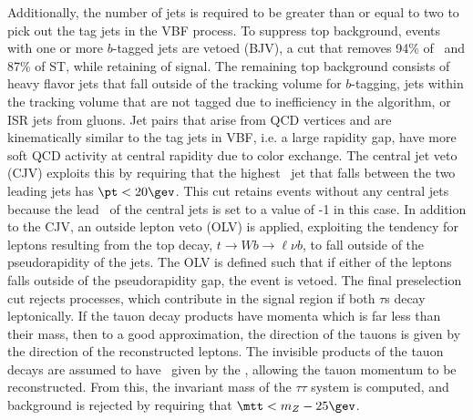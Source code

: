 Additionally, the number of jets is required to be greater than or
equal to two to pick out the tag jets in the VBF process. To suppress
top background, events with one or more $b$-tagged jets are vetoed
(BJV), a cut that removes 94\% of \ttbar~and 87\% of ST, while
retaining  of signal. The remaining top background
consists of heavy flavor jets that fall outside of the tracking volume for
$b$-tagging, jets within the tracking volume that are not tagged due
to inefficiency in the algorithm, or ISR jets from gluons. Jet pairs
that arise from QCD vertices and are kinematically similar to the tag jets in VBF, i.e. a large
rapidity gap, have more soft QCD activity at central rapidity due to
color exchange. The central jet veto (CJV) exploits this by requiring
that the highest \pt~jet that falls between the two leading jets has
$\pt<20 \gev$. This cut retains events without any central jets
because the lead \pt~of the central jets is set to a value of -1 in
this case. In addition to the CJV, an outside lepton veto (OLV) is
applied, exploiting the tendency for leptons resulting from the top decay,
$t\rightarrow{Wb}\rightarrow{\ell\nu b}$, to fall outside of the
pseudorapidity of the jets. The OLV is defined such that if either of
the leptons falls outside of the pseudorapidity gap, the event is
vetoed. The final preselection cut rejects \Ztautaunody processes,
which contribute in the signal region if both $\tau$s decay
leptonically. If the tauon decay products have momenta which is
far less than their mass, then to a good approximation, the direction
of the tauons is given by the direction of the reconstructed
leptons. The invisible products of the tauon decays are assumed to
have \pt~given by the \etmiss, allowing the tauon momentum to be
reconstructed. From this, the invariant mass of the $\tau\tau$ system
is computed, and \Ztautaunody background is rejected by
requiring that $\mtt < m_Z - 25 \gev$. 

